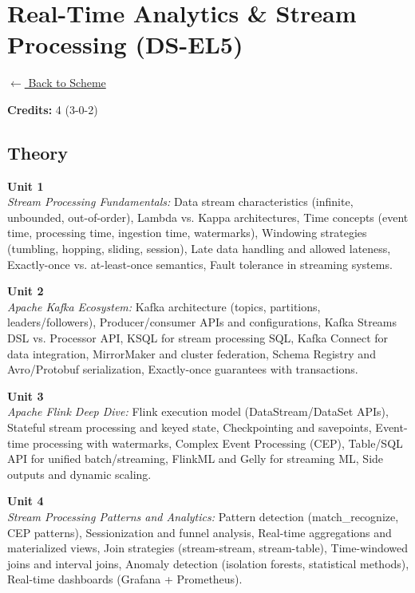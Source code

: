 \section*{Real-Time Analytics \& Stream Processing (DS-EL5)}
\label{elec:DS_5}

\noindent \small{\hyperref[main:scheme]{$\leftarrow$ Back to Scheme}} \vspace{0.5cm}

\noindent \textbf{Credits:} 4 (3-0-2)

\subsection*{Theory}
\noindent\textbf{Unit 1} \\
\textit{Stream Processing Fundamentals:} Data stream characteristics (infinite, unbounded, out-of-order), Lambda vs. Kappa architectures, Time concepts (event time, processing time, ingestion time, watermarks), Windowing strategies (tumbling, hopping, sliding, session), Late data handling and allowed lateness, Exactly-once vs. at-least-once semantics, Fault tolerance in streaming systems.

\vspace{0.3cm}

\noindent\textbf{Unit 2} \\
\textit{Apache Kafka Ecosystem:} Kafka architecture (topics, partitions, leaders/followers), Producer/consumer APIs and configurations, Kafka Streams DSL vs. Processor API, KSQL for stream processing SQL, Kafka Connect for data integration, MirrorMaker and cluster federation, Schema Registry and Avro/Protobuf serialization, Exactly-once guarantees with transactions.

\vspace{0.3cm}

\noindent\textbf{Unit 3} \\
\textit{Apache Flink Deep Dive:} Flink execution model (DataStream/DataSet APIs), Stateful stream processing and keyed state, Checkpointing and savepoints, Event-time processing with watermarks, Complex Event Processing (CEP), Table/SQL API for unified batch/streaming, FlinkML and Gelly for streaming ML, Side outputs and dynamic scaling.

\vspace{0.3cm}

\noindent\textbf{Unit 4} \\
\textit{Stream Processing Patterns and Analytics:} Pattern detection (match\_recognize, CEP patterns), Sessionization and funnel analysis, Real-time aggregations and materialized views, Join strategies (stream-stream, stream-table), Time-windowed joins and interval joins, Anomaly detection (isolation forests, statistical methods), Real-time dashboards (Grafana + Prometheus).

